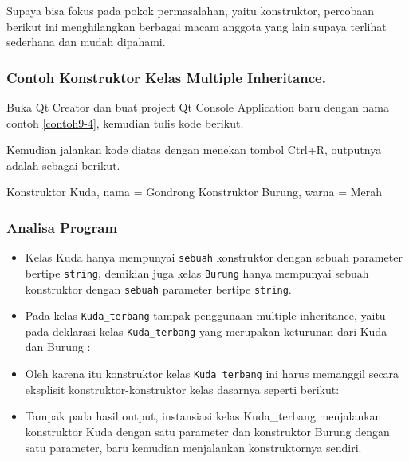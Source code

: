 Supaya bisa fokus pada pokok permasalahan, yaitu konstruktor, percobaan
berikut ini menghilangkan berbagai macam anggota yang lain supaya
terlihat sederhana dan mudah dipahami.

\subsubsection*{Contoh Konstruktor Kelas Multiple Inheritance.}

Buka Qt Creator dan buat project Qt Console Application baru dengan nama
contoh \ref{contoh9-4}, kemudian tulis kode berikut.




Kemudian jalankan kode diatas dengan menekan tombol Ctrl+R, outputnya
adalah sebagai berikut.

\begin{lcverbatim}
Konstruktor Kuda, nama = Gondrong
Konstruktor Burung, warna = Merah
\end{lcverbatim}

\subsubsection*{Analisa Program}

\begin{itemize}
\item
 Kelas Kuda hanya mempunyai \texttt{sebuah} konstruktor dengan sebuah
 parameter bertipe \texttt{string}, demikian juga kelas \texttt{Burung}
 hanya mempunyai sebuah konstruktor dengan \texttt{sebuah} parameter
 bertipe \texttt{string}.
\item
 Pada kelas \texttt{Kuda\_terbang} tampak penggunaan multiple
 inheritance, yaitu pada deklarasi kelas \texttt{Kuda\_terbang} yang
 merupakan keturunan dari Kuda dan Burung :


\item
 Oleh karena itu konstruktor kelas \texttt{Kuda\_terbang} ini harus
 memanggil secara eksplisit konstruktor-konstruktor kelas dasarnya
 seperti berikut:


\item
 Tampak pada hasil output, instansiasi kelas Kuda\_terbang menjalankan
 konstruktor Kuda dengan satu parameter dan konstruktor Burung dengan
 satu parameter, baru kemudian menjalankan konstruktornya sendiri.
\end{itemize}

